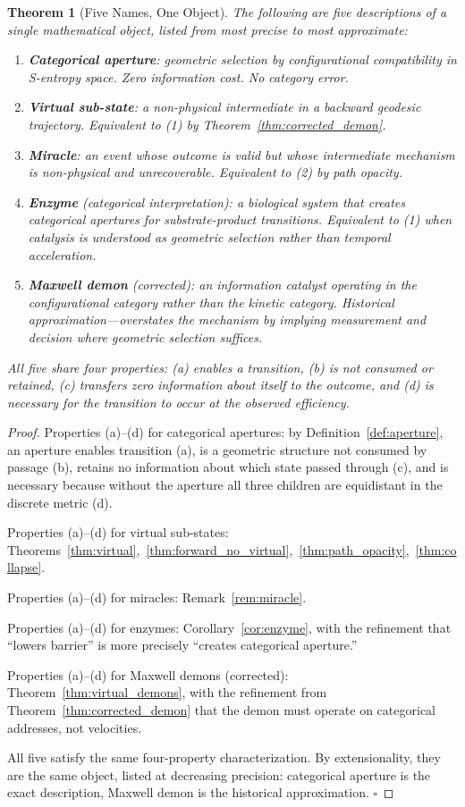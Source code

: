 \documentclass[12pt,twocolumn]{article}
\newtheorem{theorem}{Theorem}[section]
\begin{document}
\begin{theorem}[Five Names, One Object]
\label{thm:five_names}
The following are five descriptions of a single mathematical object, listed from most precise to most approximate:
\begin{enumerate}
\item \textbf{Categorical aperture}: geometric selection by configurational compatibility in S-entropy space. Zero information cost. No category error.
\item \textbf{Virtual sub-state}: a non-physical intermediate in a backward geodesic trajectory. Equivalent to (1) by Theorem~\ref{thm:corrected_demon}.
\item \textbf{Miracle}: an event whose outcome is valid but whose intermediate mechanism is non-physical and unrecoverable. Equivalent to (2) by path opacity.
\item \textbf{Enzyme} (categorical interpretation): a biological system that creates categorical apertures for substrate-product transitions. Equivalent to (1) when catalysis is understood as geometric selection rather than temporal acceleration.
\item \textbf{Maxwell demon} (corrected): an information catalyst operating in the configurational category rather than the kinetic category. Historical approximation---overstates the mechanism by implying measurement and decision where geometric selection suffices.
\end{enumerate}
All five share four properties: (a) enables a transition, (b) is not consumed or retained, (c) transfers zero information about itself to the outcome, and (d) is necessary for the transition to occur at the observed efficiency.
\end{theorem}

\begin{proof}
Properties (a)--(d) for categorical apertures: by Definition~\ref{def:aperture}, an aperture enables transition (a), is a geometric structure not consumed by passage (b), retains no information about which state passed through (c), and is necessary because without the aperture all three children are equidistant in the discrete metric (d).

Properties (a)--(d) for virtual sub-states: Theorems~\ref{thm:virtual},~\ref{thm:forward_no_virtual},~\ref{thm:path_opacity},~\ref{thm:collapse}.

Properties (a)--(d) for miracles: Remark~\ref{rem:miracle}.

Properties (a)--(d) for enzymes: Corollary~\ref{cor:enzyme}, with the refinement that ``lowers barrier'' is more precisely ``creates categorical aperture.''

Properties (a)--(d) for Maxwell demons (corrected): Theorem~\ref{thm:virtual_demons}, with the refinement from Theorem~\ref{thm:corrected_demon} that the demon must operate on categorical addresses, not velocities.

All five satisfy the same four-property characterization. By extensionality, they are the same object, listed at decreasing precision: categorical aperture is the exact description, Maxwell demon is the historical approximation. $\square$
\end{proof}
\end{document}
